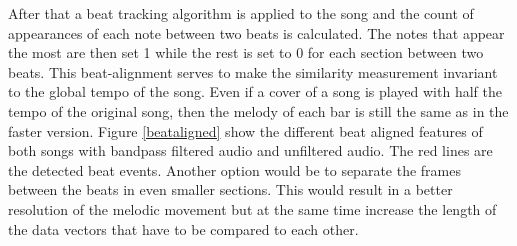 \noindent After that a beat tracking algorithm is applied to the song and the count of appearances of each note between two beats is calculated. The notes that appear the most are then set 1 while the rest is set to 0 for each section between two beats. This beat-alignment serves to make the similarity measurement invariant to the global tempo of the song. Even if a cover of a song is played with half the tempo of the original song, then the melody of each bar is still the same as in the faster version.
Figure \ref{beataligned} show the different beat aligned features of both songs with bandpass filtered audio and unfiltered audio. The red lines are the detected beat events.
Another option would be to separate the frames between the beats in even smaller sections. This would result in a better resolution of the melodic movement but at the same time increase the length of the data vectors that have to be compared to each other.
